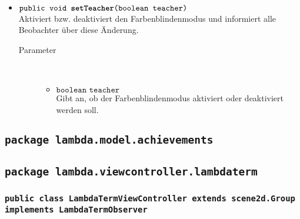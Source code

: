 \begin{description}
\begin{itemize}
		\item $\texttt{public void \textbf{setTeacher}(boolean teacher)}$ \\ Aktiviert bzw. deaktiviert den Farbenblindenmodus und informiert alle Beobachter über diese Änderung.
		\begin{description}
			\item[Parameter] \hfill \\
			\vspace{-.8cm}
			\begin{itemize}
				\item $\texttt{boolean teacher}$ \\ Gibt an, ob der Farbenblindenmodus aktiviert oder deaktiviert werden soll.
			\end{itemize}
		\end{description}
	\end{itemize}
\end{description}

\subsection{\texttt{package lambda.model.achievements}}


\subsection{\texttt{package lambda.viewcontroller.lambdaterm}}

\subsubsection{\normalfont \texttt{public class \textbf{LambdaTermViewController} extends scene2d.Group implements LambdaTermObserver}}

